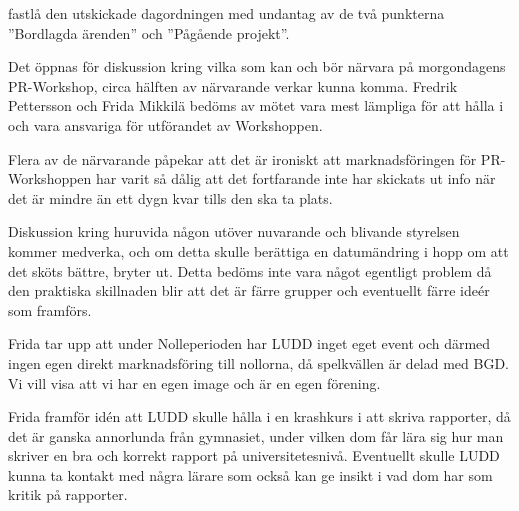 \documentclass{protokoll}
\begin{document}
\newpage  


\begin{beslut}
     \att fastlå den utskickade dagordningen med undantag av de två punkterna ''Bordlagda ärenden'' och ''Pågående projekt''.
\end{beslut}

Det öppnas för diskussion kring vilka som kan och bör närvara på morgondagens PR-Workshop, circa hälften av närvarande verkar kunna komma.
Fredrik Pettersson och Frida Mikkilä bedöms av mötet vara mest lämpliga för att hålla i och vara ansvariga för utförandet av Workshoppen.  

Flera av de närvarande påpekar att det är ironiskt att marknadsföringen för PR-Workshoppen har varit så dålig att det fortfarande inte har skickats ut info när det är mindre än ett dygn kvar tills den ska ta plats.  

Diskussion kring huruvida någon utöver nuvarande och blivande styrelsen kommer medverka, och om detta skulle berättiga en datumändring i hopp om att det sköts bättre, bryter ut. Detta bedöms inte vara något egentligt problem då den praktiska skillnaden blir att det är färre grupper och eventuellt färre ideér som framförs.

Frida tar upp att under Nolleperioden har LUDD inget eget event och därmed ingen egen direkt marknadsföring till nollorna, då spelkvällen är delad med BGD. Vi vill visa att vi har en egen image och är en egen förening.  

Frida framför idén att LUDD skulle hålla i en krashkurs i att skriva rapporter, då det är ganska annorlunda från gymnasiet, under vilken dom får lära sig hur man skriver en bra och korrekt rapport på universitetesnivå. Eventuellt skulle LUDD kunna ta kontakt med några lärare som också kan ge insikt i vad dom har som kritik på rapporter. 
\end{document}
